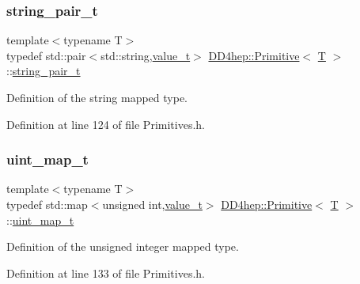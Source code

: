 \subsubsection{\texorpdfstring{string\+\_\+pair\+\_\+t}{string\_pair\_t}}
{\footnotesize\ttfamily template$<$typename T$>$ \\
typedef std\+::pair$<$std\+::string,\hyperlink{struct_d_d4hep_1_1_primitive_a0639e73bb8f07f99c2d8401f807a7af6}{value\+\_\+t}$>$ \hyperlink{struct_d_d4hep_1_1_primitive}{D\+D4hep\+::\+Primitive}$<$ \hyperlink{class_t}{T} $>$\+::\hyperlink{struct_d_d4hep_1_1_primitive_ab799730f156ae3e2ba15f621289c0e99}{string\+\_\+pair\+\_\+t}}



Definition of the string mapped type. 



Definition at line 124 of file Primitives.\+h.

\hypertarget{struct_d_d4hep_1_1_primitive_a6c4a254056e6d4de6c023c0f099ad40f}{}\label{struct_d_d4hep_1_1_primitive_a6c4a254056e6d4de6c023c0f099ad40f} 
\subsubsection{\texorpdfstring{uint\+\_\+map\+\_\+t}{uint\_map\_t}}
{\footnotesize\ttfamily template$<$typename T$>$ \\
typedef std\+::map$<$unsigned int,\hyperlink{struct_d_d4hep_1_1_primitive_a0639e73bb8f07f99c2d8401f807a7af6}{value\+\_\+t}$>$ \hyperlink{struct_d_d4hep_1_1_primitive}{D\+D4hep\+::\+Primitive}$<$ \hyperlink{class_t}{T} $>$\+::\hyperlink{struct_d_d4hep_1_1_primitive_a6c4a254056e6d4de6c023c0f099ad40f}{uint\+\_\+map\+\_\+t}}



Definition of the unsigned integer mapped type. 



Definition at line 133 of file Primitives.\+h.

\hypertarget{struct_d_d4hep_1_1_primitive_a1f46f9637b5b90c407a5725db6d09142}{}\label{struct_d_d4hep_1_1_primitive_a1f46f9637b5b90c407a5725db6d09142} 
